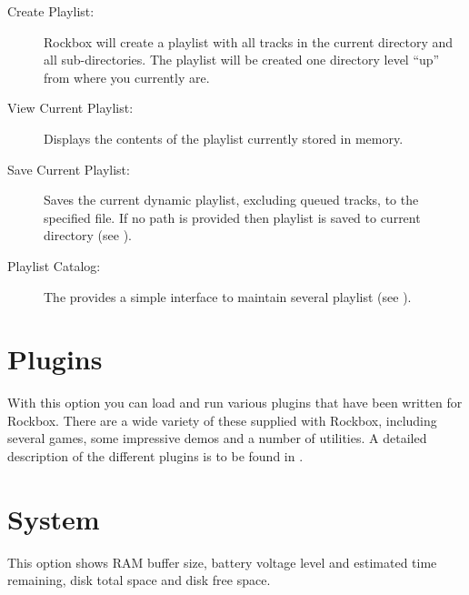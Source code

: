\begin{description}
\item[Create Playlist:]
  Rockbox will create a playlist with all tracks in the current directory 
and all sub-directories. The playlist will be created one directory level ``up'' 
from where you currently are.
  
\item[View Current Playlist:]
  Displays the contents of the playlist currently stored in memory.
  
\item[Save Current Playlist:]
  Saves the current dynamic playlist, excluding queued tracks, to the 
specified file. If no path is provided then playlist is saved to current 
directory (see ).

\item[Playlist Catalog:]
  The  provides a simple interface to maintain
  several playlist (see ).
\end{description}

\section{Plugins}
  With this option you can load and run various plugins that have been
written for Rockbox. There are a wide variety of these supplied with
Rockbox, including several games, some impressive demos and a number of
utilities. A detailed description of the different plugins is to be found in 
.

\section{\label{ref:Info}System}
  This option shows RAM buffer size, battery voltage level and estimated time
remaining, disk total space and disk free space.

